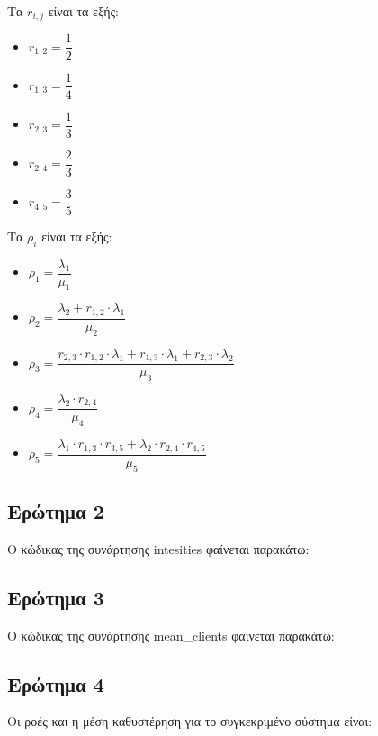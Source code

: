 \documentclass[12pt]{article}
\begin{document}
Τα $r_{i,j}$ είναι τα εξής: 
\begin{itemize}
    \item{$r_{1,2} = \dfrac{1}{2}$}
    \item{$r_{1,3} = \dfrac{1}{4}$}
    \item{$r_{2,3} = \dfrac{1}{3}$}
    \item{$r_{2,4} = \dfrac{2}{3}$}
    \item{$r_{4,5} = \dfrac{3}{5}$}
\end{itemize}

Τα $\rho_i$ είναι τα εξής:
\begin{itemize}
    \item{$\rho_1 = \dfrac{\lambda_1}{\mu_1}$}
    \item{$\rho_2 = \dfrac{\lambda_2 + r_{1,2}\cdot \lambda_1}{\mu_2}$}
    \item{$\rho_3 = \dfrac{r_{2,3}\cdot r_{1,2}\cdot \lambda_1 + r_{1,3} \cdot \lambda_1 + r_{2,3} \cdot \lambda_2}{\mu_3}$}
    \item{$\rho_4 = \dfrac{\lambda_2 \cdot r_{2,4}}{\mu_4}$}
    \item{$\rho_5 = \dfrac{\lambda_1 \cdot r_{1,3} \cdot r_{3,5} + \lambda_2 \cdot r_{2,4} \cdot r_{4,5}}{\mu_5}$}
\end{itemize}

\subsection{Ερώτημα 2}

Ο κώδικας της συνάρτησης intesities φαίνεται παρακάτω: 


\subsection{Ερώτημα 3}

Ο κώδικας της συνάρτησης mean\_clients φαίνεται παρακάτω: 


\subsection{Ερώτημα 4}

Οι ροές και η μέση καθυστέρηση για το συγκεκριμένο σύστημα είναι:

\end{document}
